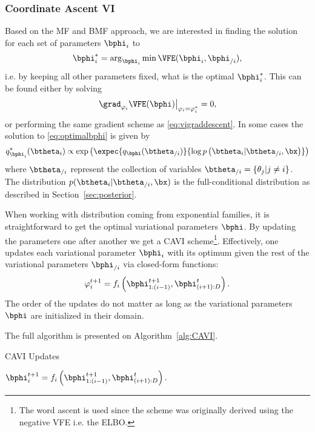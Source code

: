 \subsubsection{Coordinate Ascent VI}
\label{sec:cavi}
Based on the \ac{MF} and \ac{BMF} approach, we are interested in finding the solution for each set of parameters $\bphi_i$ to
\begin{align}
    \bphi_i^* = \arg_{\bphi_i}\min \VFE(\bphi_i, \bphi_{/i}),
    \label{eq:optimalbphi}
\end{align}
i.e. by keeping all other parameters fixed, what is the optimal $\bphi_i^*$.
This can be found either by solving
\begin{align}
\left.\grad_{\varphi_i}\VFE(\bphi)\right\vert_{\varphi_i=\varphi_i^*} = 0,
\end{align}
or performing the same gradient scheme as \eqref{eq:vigraddescent}.
In some cases the solution to \eqref{eq:optimalbphi} is given by
\begin{align}
q_{\bphi_i}^*(\btheta_i) \propto \exp\left(\expec{q_{\bphi}(\btheta_{/i})}{\log p\left(\btheta_i|\btheta_{/i},\bx\right)}\right)
\end{align}
where $\btheta_{/i}$ represent the collection of variables $\btheta_{/i} = \{\theta_j | j \neq i\}$.
The distribution $p(\btheta_i|\btheta_{/i},\bx)$ is the full-conditional distribution as described in Section~\ref{sec:posterior}.

When working with distribution coming from exponential families, it is straightforward to get the optimal variational parameters $\bphi$.
By updating the parameters one after another we get a \ac{CAVI} scheme\footnote{The word ascent is used since the scheme was originally derived using the negative \ac{VFE} i.e. the \ac{ELBO}.}.
Effectively, one updates each variational parameter $\bphi_i$ with its optimum given the rest of the variational parameters $\bphi_{/i}$ via closed-form functions:
\begin{align}
\varphi_i^{t+1} = f_i\left(\bphi_{1:(i-1)}^{t+1}, \bphi_{(i+1):D}^t\right).
\end{align}
The order of the updates do not matter as long as the variational parameters $\bphi$ are initialized in their domain.

The full algorithm is presented on Algorithm~\ref{alg:CAVI}.

\begin{algorithm}
    \caption{\ac{CAVI} Updates}
    \label{alg:CAVI}
    \begin{algorithmic}
                \State $\bphi_i^{t+1} = f_i\left(\bphi_{1:(i-1)}^{t+1}, \bphi_{(i+1):D}^t\right).$
            \EndFor
        \EndWhile
    \end{algorithmic}
\end{algorithm}


